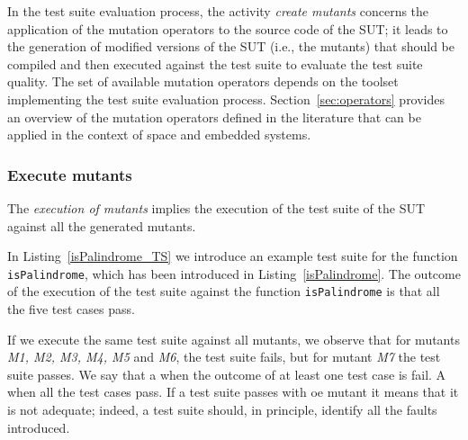 
In the test suite evaluation process, the activity \emph{create mutants} concerns the application of the mutation operators to the source code of the SUT; it leads to the generation of modified versions of the SUT (i.e., the mutants) that should be compiled and then executed against the test suite to evaluate the test suite quality. 
The set of available mutation operators depends on the toolset implementing the test suite evaluation process.
Section~\ref{sec:operators} provides an overview of the mutation operators defined in the literature that can be applied in the context of space and embedded systems.

\subsubsection{Execute mutants}


The \emph{execution of mutants} implies the execution of the test suite of the SUT against all the generated mutants. 





In Listing~\ref{isPalindrome_TS} we introduce an example test suite for the function \texttt{isPalindrome}, which has been introduced in Listing~\ref{isPalindrome}. 
The outcome of the execution of the test suite against the function \texttt{isPalindrome} is that all the five test cases pass.

If we execute the same test suite against all mutants, we observe that for mutants \textit{M1, M2, M3, M4, M5} and \textit{M6}, the test suite fails, but for mutant \textit{M7} the test suite passes. We say that a  when the outcome of at least one test case is fail. A  when all the test cases pass. If a test suite passes with oe mutant it means that it is not adequate; indeed, a test suite should, in principle, identify all the faults introduced.

